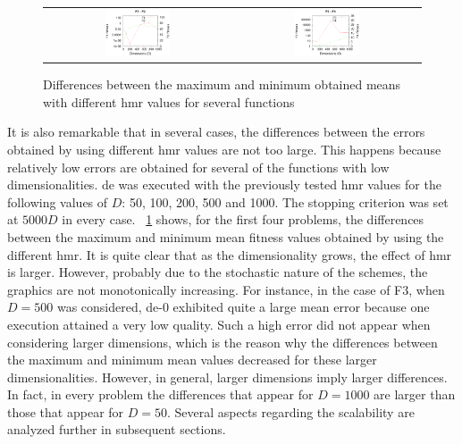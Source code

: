 \documentclass[review,3p]{elsarticle}
\newcommand{\DE}{{\sc de}}
\newcommand{\HMR}{{\sc hmr}}
\begin{document}
\begin{figure}[!t]
\centering
\begin{tabular}{cc}
  \includegraphics[width=0.36\textwidth]{images/DifGrow/F1_F2_DifGrow.eps} & \includegraphics[width=0.36\textwidth]{images/DifGrow/F3_F4_DifGrow.eps}
\end{tabular}
\caption{Differences between the maximum and minimum obtained means with different \HMR{} values for several functions}
\label{fig:hmr_dimensions}
\end{figure}


It is also remarkable that in several cases, the differences between the errors obtained by using different \HMR{} values are not too large.
%
This happens because relatively low errors are obtained for several of the functions with low dimensionalities.
%
\DE{} was executed with the previously tested \HMR{} values for the following values of $D$: 50, 100, 200, 500 and 1000.
%
The stopping criterion was set at $5000D$ in every case.
%
\figurename~\ref{fig:hmr_dimensions} shows, for the first four problems, the differences between the maximum and minimum mean fitness values
obtained by using the different \HMR{}.
%
It is quite clear that as the dimensionality grows, the effect of \HMR{} is larger.
%
However, probably due to the stochastic nature of the schemes, the graphics are not monotonically increasing.
%
For instance, in the case of F3, when $D = 500$ was considered, \DE{}-0 exhibited quite a large mean error because
one execution attained a very low quality.
%
Such a high error did not appear when considering larger dimensions, which is the reason why the differences between the
maximum and minimum mean values decreased for these larger dimensionalities.
%
However, in general, larger dimensions imply larger differences.
%
In fact, in every problem the differences that appear for $D = 1000$ are larger
than those that appear for $D = 50$.
%
Several aspects regarding the scalability are analyzed further in subsequent sections.
\end{document}
